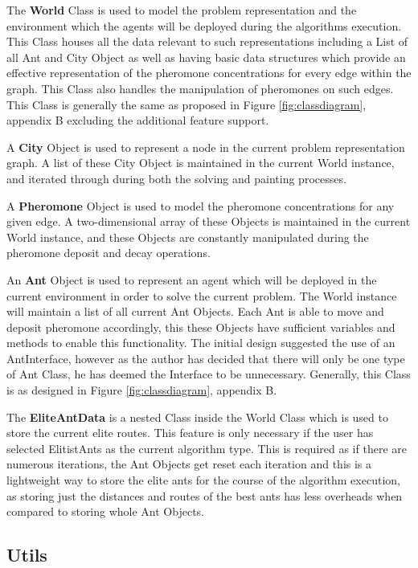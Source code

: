 The \textbf{World} Class is used to model the problem representation and the environment which the agents will be deployed during the algorithms execution. This Class houses all the data relevant to such representations including a List of all Ant and City Object as well as having basic data structures which provide an effective representation of the pheromone concentrations for every edge within the graph. This Class also handles the manipulation of pheromones on such edges. This Class is generally the same as proposed in Figure \ref{fig:classdiagram}, appendix B excluding the additional feature support.

A \textbf{City} Object is used to represent a node in the current problem representation graph. A list of these City Object is maintained in the current World instance, and iterated through during both the solving and painting processes.

A \textbf{Pheromone} Object is used to model the pheromone concentrations for any given edge. A two-dimensional array of these Objects is maintained in the current World instance, and these Objects are constantly manipulated during the pheromone deposit and decay operations. 

An \textbf{Ant} Object is used to represent an agent which will be deployed in the current environment in order to solve the current problem. The World instance will maintain a list of all current Ant Objects. Each Ant is able to move and deposit pheromone accordingly, this these Objects have sufficient variables and methods to enable this functionality. The initial design suggested the use of an AntInterface, however as the author has decided that there will only be one type of Ant Class, he has deemed the Interface to be unnecessary. Generally, this Class is as designed in Figure \ref{fig:classdiagram}, appendix B.

The \textbf{EliteAntData} is a nested Class inside the World Class which is used to store the current elite routes. This feature is only necessary if the user has selected ElitistAnts as the current algorithm type. This is required as if there are numerous iterations, the Ant Objects get reset each iteration and this is a lightweight way to store the elite ants for the course of the algorithm execution, as storing just the distances and routes of the best ants has less overheads when compared to storing whole Ant Objects.

\subsection{Utils}

